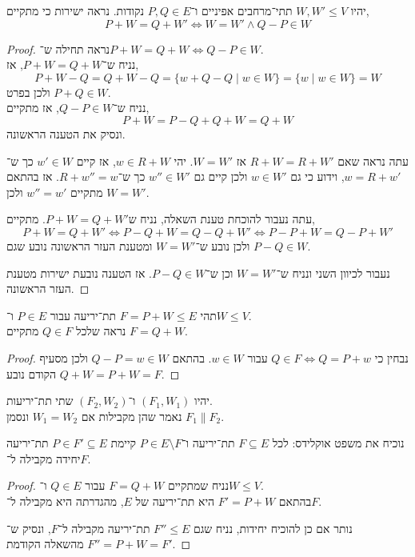 \question{}
\subquestion{}
יהיו $W, W' \le V$ תתי־מרחבים אפיניים ו־$P, Q \in E$ נקודות.
נראה ישירות כי מתקיים,
\[
	P + W
	= Q + W'
	\iff W = W' \land Q - P \in W
\]
\begin{proof}
	נראה תחילה ש־$P + W = Q + W \iff Q - P \in W$. \\
	נניח ש־$P + W = Q + W$, אז,
	\[
		P + W - Q
		= Q + W - Q
		= \{ w + Q - Q \mid w \in W \}
		= \{ w \mid w \in W \}
		= W
	\]
	ולכן בפרט $P + Q \in W$. \\
	נניח ש־$Q - P \in W$, אז מתקיים,
	\[
		P + W
		= P - Q + Q + W
		= Q + W
	\]
	ונסיק את הטענה הראשונה.

	עתה נראה שאם $R + W = R + W'$ אז $W = W'$.
	יהי $w \in R + W$, אז קיים $w' \in W$ כך ש־$w = R + w'$, וידוע כי גם $w \in W'$ ולכן קיים גם $w'' \in W'$ כך ש־$R + w'' = w$.
	אז בהתאם מתקיים $w'' = w'$ ולכן $W = W'$.

	עתה נעבור להוכחת טענת השאלה, נניח ש$P + W = Q + W'$.
	מתקיים,
	\[
		P + W = Q + W'
		\iff P - Q + W = Q - Q + W'
		\iff P - P + W = Q - P + W'
	\]
	ולכן נובע ש־$W = W'$ ומטענת העזר הראשונה נובע שגם $P - Q \in W$.

	נעבור לכיוון השני ונניח ש־$W = W'$ וכן ש־$P - Q \in W$.
	אז הטענה נובעת ישירות מטענת העזר הראשונה.
\end{proof}

\subquestion{}
תהי $F = P + W \le E$ תת־יריעה עבור $P \in E$ ו־$W \le V$. \\
נראה שלכל $Q \in F$ מתקיים $F = Q + W$.
\begin{proof}
	נבחין כי $Q \in F \iff Q = P + w$ עבור $w \in W$.
	בהתאם $Q - P = w \in W$ ולכן מסעיף הקודם נובע $Q + W = P + W = F$.
\end{proof}

\question{}
\begin{definition}
	יהיו $(F_1, W_1)$ ו־$(F_2, W_2)$ שתי תת־יריעות. \\
	נאמר שהן מקבילות אם $W_1 = W_2$ ונסמן $F_1 \parallel F_2$.
\end{definition}
נוכיח את משפט אוקלידס: לכל $F \subseteq E$ תת־יריעה ו־$P \in E \setminus F$ קיימת $P \in F' \subseteq E$ תת־יריעה יחידה מקבילה ל־$F$.
\begin{proof}
	נניח שמתקיים $F = Q + W$ עבור $Q \in E$ ו־$W \le V$. \\
	בהתאם $F' = P + W$ היא תת־יריעה של $E$, מהגדרתה היא מקבילה ל־$F$.

	נותר אם כן להוכיח יחידות, נניח שגם $F'' \le E$ תת־יריעה מקבילה ל־$F$, ונסיק ש־$F'' = P + W = F'$ מהשאלה הקודמת.
\end{proof}

